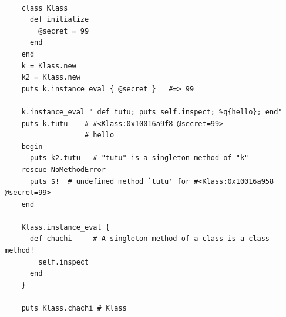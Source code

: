   \begin{latexonly}
    \begin{lstlisting}

    class Klass
      def initialize
        @secret = 99
      end
    end
    k = Klass.new
    k2 = Klass.new
    puts k.instance_eval { @secret }   #=> 99
    
    k.instance_eval " def tutu; puts self.inspect; %q{hello}; end"  
    puts k.tutu    # #<Klass:0x10016a9f8 @secret=99> 
                   # hello
    begin
      puts k2.tutu   # "tutu" is a singleton method of "k"
    rescue NoMethodError
      puts $!  # undefined method `tutu' for #<Klass:0x10016a958 @secret=99>
    end
    
    Klass.instance_eval {
      def chachi     # A singleton method of a class is a class method!
        self.inspect
      end
    }
    
    puts Klass.chachi # Klass

    \end{lstlisting}
  \end{latexonly}
